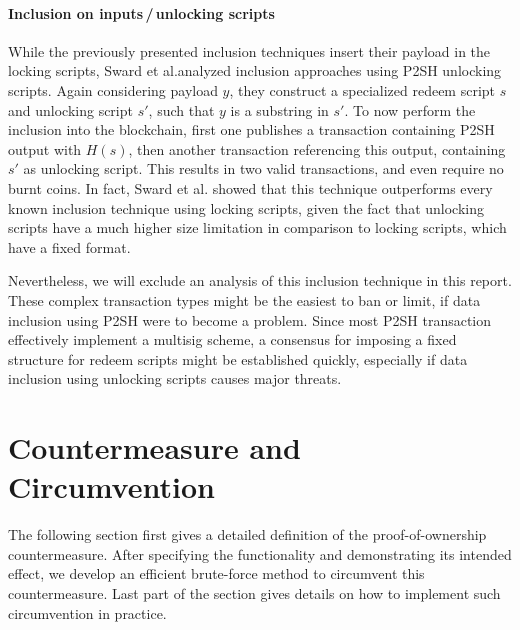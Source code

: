 \documentclass[a4paper,11pt,titlepage]{scrbook}
\begin{document}
\subsubsection*{Inclusion on inputs\,/\,unlocking scripts}
While the previously presented inclusion techniques insert their payload in the locking scripts, Sward et al.\@ analyzed inclusion approaches using P2SH unlocking scripts.
Again considering payload $y$, they construct a specialized redeem script $s$ and unlocking script $s'$, 
such that $y$ is a substring in $s'$.
To now perform the inclusion into the blockchain, first one publishes a transaction containing P2SH output with $H(s)$, then another transaction referencing this output, containing $s'$ as unlocking script.
This results in two valid transactions, and even require no burnt coins.
In fact, Sward et al. showed that this technique outperforms every known inclusion technique using locking scripts, given the fact that unlocking scripts have a much higher size limitation in comparison to locking scripts, which have a fixed format.

Nevertheless, we will exclude an analysis of this inclusion technique in this report.
These complex transaction types might be the easiest to ban or limit, if data inclusion using P2SH were to become a problem.
Since most P2SH transaction effectively implement a multisig scheme, a consensus for imposing a fixed structure for redeem scripts might be established quickly, especially if data inclusion using unlocking scripts causes major threats.






\chapter{Countermeasure and Circumvention}

The following section first gives a detailed definition of the proof-of-ownership countermeasure. After specifying the functionality and demonstrating its intended effect, we develop an efficient brute-force method to circumvent this countermeasure. Last part of the section gives details on how to implement such circumvention in practice.
\end{document}
